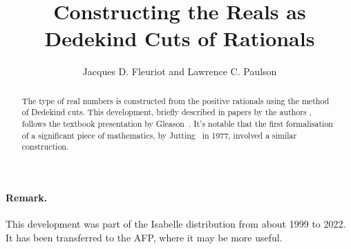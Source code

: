 \documentclass[11pt,a4paper]{article}
\begin{document}
\title{Constructing the Reals as Dedekind Cuts of Rationals}
\author{Jacques D. Fleuriot and Lawrence C. Paulson}
\maketitle

\begin{abstract}
The type of real numbers is constructed from the positive rationals using the method of Dedekind cuts. This development, briefly described in papers by the authors \cite{fleuriot-real-analysis,fleuriot-jcm}, follows the textbook presentation by Gleason~\cite{gleason-fundamentals}.
It's notable that the first formalisation of a significant piece of mathematics, by Jutting~\cite{jutting77} in 1977, involved a similar construction.
\end{abstract}

\newpage
\tableofcontents

\paragraph*{Remark.}
This development was part of the Isabelle distribution from about 1999 to 2022. 
It has been transferred to the AFP, where it may be more useful.

\newpage





\end{document}
